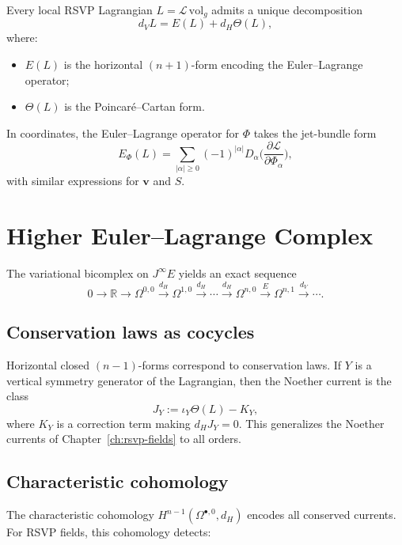 \begin{proposition}
Every local RSVP Lagrangian $L = \mathcal{L}\,\mathrm{vol}_g$ admits a unique
decomposition
\[
d_V L = E(L) + d_H \Theta(L),
\]
where:
\begin{itemize}
  \item $E(L)$ is the horizontal $(n+1)$-form encoding the Euler--Lagrange
        operator;
  \item $\Theta(L)$ is the Poincaré--Cartan form.
\end{itemize}
\end{proposition}

In coordinates, the Euler--Lagrange operator for $\Phi$ takes the jet-bundle
form
\[
E_\Phi(L)
= \sum_{|\alpha|\ge 0}
  (-1)^{|\alpha|}
  D_\alpha\bigg(
    \frac{\partial \mathcal{L}}{\partial \Phi_\alpha}
  \bigg),
\]
with similar expressions for $\mathbf{v}$ and $S$.

\section{Higher Euler--Lagrange Complex}

The variational bicomplex on $J^\infty E$ yields an exact sequence
\[
0 \longrightarrow \mathbb{R}
\longrightarrow \Omega^{0,0}
\xrightarrow{d_H}
\Omega^{1,0}
\xrightarrow{d_H}
\cdots
\xrightarrow{d_H}
\Omega^{n,0}
\xrightarrow{E}
\Omega^{n,1}
\xrightarrow{d_V}
\cdots.
\]

\subsection{Conservation laws as cocycles}

Horizontal closed $(n-1)$-forms correspond to conservation laws.  
If $Y$ is a vertical symmetry generator of the Lagrangian, then the Noether
current is the class
\[
J_Y := \iota_Y\Theta(L) - K_Y,
\]
where $K_Y$ is a correction term making $d_H J_Y = 0$.
This generalizes the Noether currents of Chapter~\ref{ch:rsvp-fields} to all
orders.

\subsection{Characteristic cohomology}

The characteristic cohomology $H^{n-1}(\Omega^{\bullet,0},d_H)$ encodes all
conserved currents.  For RSVP fields, this cohomology detects:

